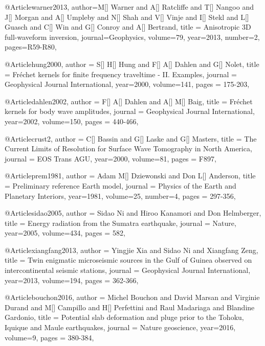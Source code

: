 @Article{warner2013,
  author={M[] Warner and A[] Ratcliffe and T[] Nangoo and J[] Morgan and A[] Umpleby and N[] Shah and V[] Vinje and I[] Stekl and L[] Guasch and C[] Win and G[] Conroy and A[] Bertrand},
  title = {Anisotropic 3{D} full-waveform inversion},
  journal={Geophysics},
  volume=79,
  year=2013,
  number=2,
  pages={R59-R80},
}

@Article{hung2000,
  author =	 {S[] H[] Hung and F[] A[] Dahlen and G[] Nolet},
  title =	 {Fr\'{e}chet kernels for finite frequency traveltime - {II}. Examples},
  journal =	 {Geophysical Journal International},
  year=2000,
  volume=141,
  pages =	 {175-203},
}


@Article{dahlen2002,
  author =	 {F[] A[] Dahlen and A[] M[] Baig},
  title =	 {Fr\'{e}chet kernels for body wave amplitudes},
  journal =	 {Geophysical Journal International},
  year=2002,
  volume=150,
  pages =	 {440-466},
}


@Article{crust2,
  author =	 {C[] Bassin and G[] Laske and G[] Masters},
  title =	 {The Current Limits of Resolution for Surface Wave Tomography in North America},
  journal =	 {EOS Trans AGU},
  year=2000,
  volume=81,
  pages =	 {F897},
}

@Article{prem1981,
  author =	 {Adam M[] Dziewonski and Don L[] Anderson},
  title =	 {Preliminary reference Earth model},
  journal =	 {Physics of the Earth and Planetary Interiors},
  year=1981,
  volume=25,
  number=4,
  pages =	 {297-356},
}



@Article{sidao2005,
  author =	 {Sidao Ni and Hiroo Kanamori and Don Helmberger},
  title =	 {Energy radiation from the Sumatra earthquake},
  journal =	 {Nature},
  year=2005,
  volume=434,
  pages =	 {582},
}

@Article{xiangfang2013,
  author =	 {Yingjie Xia and Sidao Ni and Xiangfang Zeng},
  title =	 {Twin enigmatic microseismic sources in the Gulf of Guinea observed on intercontinental seismic stations},
  journal =	 {Geophysical Journal International},
  year=2013,
  volume=194,
  pages =	 {362-366},
}

@Article{bouchon2016,
  author =	 {Michel Bouchon and David Marsan and Virginie Durand and M[] Campillo and H[] Perfettini and Raul Madariaga and Blandine Gardonio},
  title =	 {Potential slab deformation and pluge prior to the {T}ohoku, {I}quique and {M}aule earthquakes},
  journal =	 {Nature geoscience},
  year=2016,
  volume=9,
  pages =	 {380-384},
}

